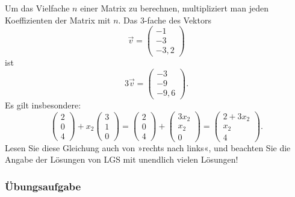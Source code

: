 Um das Vielfache $n$ einer Matrix zu berechnen, multipliziert man jeden Koeffizienten der Matrix mit $n$. Das 3-fache des Vektors
\[ \vec{v} = \begin{pmatrix} -1 \\ -3 \\ -3{,}2 \end{pmatrix} \]
ist
\[ 3\vec{v} = \begin{pmatrix} -3 \\ -9 \\ -9{,}6 \end{pmatrix} . \]
Es gilt insbesondere:
\[ \begin{pmatrix} 2 \\ 0 \\ 4 \end{pmatrix} + x_2 \begin{pmatrix} 3 \\ 1 \\ 0 \end{pmatrix} = \begin{pmatrix} 2 \\ 0 \\ 4 \end{pmatrix} + \begin{pmatrix} 3x_2 \\ x_2 \\ 0 \end{pmatrix} = \begin{pmatrix} 2 + 3x_2 \\ x_2 \\ 4 \end{pmatrix} . \]
Lesen Sie diese Gleichung auch von »rechts nach links«, und beachten Sie die Angabe der Lösungen von LGS mit unendlich vielen Lösungen!

\subsubsection{Übungsaufgabe}

